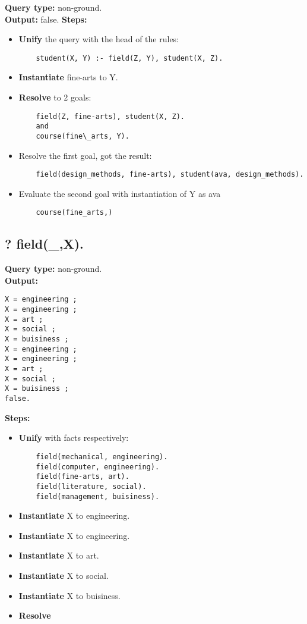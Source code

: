 \textbf{Query type: } non-ground. \\
\textbf{Output:} false.
\textbf{Steps:}
\begin{itemize}
    \item \textbf{Unify} the query with the head of the rules:
    \begin{lstlisting}
    student(X, Y) :- field(Z, Y), student(X, Z).
    \end{lstlisting}
\item \textbf{Instantiate} fine-arts to Y.
    \item \textbf{Resolve} to 2 goals:
    \begin{lstlisting}
    field(Z, fine-arts), student(X, Z).
    and
    course(fine\_arts, Y).
    \end{lstlisting}
    \item Resolve the first goal, got the result:
    \begin{lstlisting}
    field(design_methods, fine-arts), student(ava, design_methods).
    \end{lstlisting}
\item Evaluate the second goal with instantiation of Y as ava
    \begin{lstlisting}
    course(fine_arts,)
    \end{lstlisting}
\end{itemize}

\subsection{? field(\_,X).}
\textbf{Query type: } non-ground. \\
\textbf{Output:} 
\begin{lstlisting}
X = engineering ;
X = engineering ;
X = art ;
X = social ;
X = buisiness ;
X = engineering ;
X = engineering ;
X = art ;
X = social ;
X = buisiness ;
false.
\end{lstlisting}

\textbf{Steps:}
\begin{itemize}
    \item \textbf{Unify} with facts respectively:
    \begin{lstlisting}
    field(mechanical, engineering).
    field(computer, engineering).
    field(fine-arts, art).
    field(literature, social).
    field(management, buisiness).
    \end{lstlisting}
    \item \textbf{Instantiate} X to engineering.
    \item \textbf{Instantiate} X to engineering.
    \item \textbf{Instantiate} X to art.
    \item \textbf{Instantiate} X to social.
    \item \textbf{Instantiate} X to buisiness.
    \item \textbf{Resolve}
\end{itemize}

